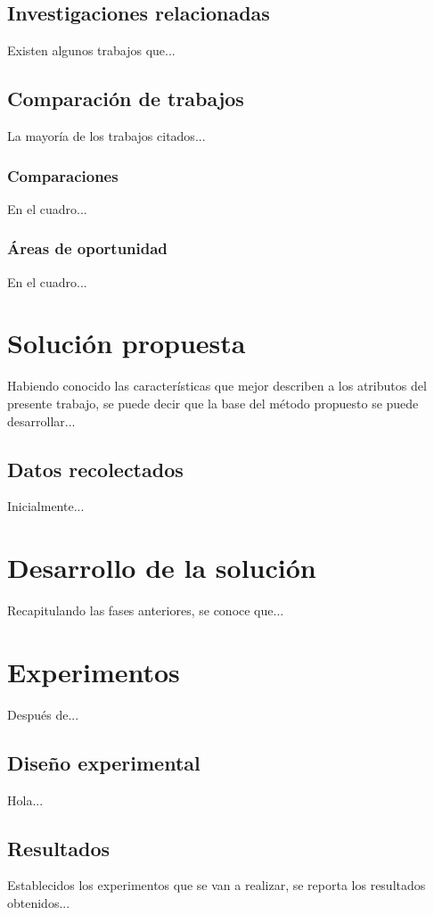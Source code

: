 \section{Investigaciones relacionadas}
Existen algunos trabajos que...

\section{Comparación de trabajos}
La mayoría de los trabajos citados...

\subsection{Comparaciones}
En el cuadro...

\subsection{Áreas de oportunidad}
En el cuadro...


\chapter{Solución propuesta}
Habiendo conocido las características que mejor describen a los atributos del presente trabajo, se puede decir que la base del método propuesto se puede desarrollar...

\section{Datos recolectados}
Inicialmente...


\chapter{Desarrollo de la solución}
Recapitulando las fases anteriores, se conoce que...


\chapter{Experimentos}
Después de...

\section{Diseño experimental}
Hola...

\section{Resultados}
Establecidos los experimentos que se van a realizar, se reporta los resultados obtenidos...

